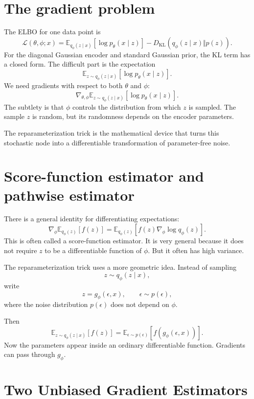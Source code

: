 
\section{The gradient problem}

The ELBO for one data point is
\[
  \mathcal L(\theta,\phi;x)
  =\mathbb E_{q_\phi(z\mid x)}[\log p_\theta(x\mid z)]
  -D_{\mathrm{KL}}(q_\phi(z\mid x)\Vert p(z)).
\]
For the diagonal Gaussian encoder and standard Gaussian prior, the KL term has a closed form.  The difficult part is the expectation
\[
  \mathbb E_{z\sim q_\phi(z\mid x)}[\log p_\theta(x\mid z)].
\]
We need gradients with respect to both \(\theta\) and \(\phi\):
\[
  \nabla_{\theta,\phi}\mathbb E_{z\sim q_\phi(z\mid x)}[\log p_\theta(x\mid z)].
\]
The subtlety is that \(\phi\) controls the distribution from which \(z\) is sampled.  The sample \(z\) is random, but its randomness depends on the encoder parameters.

The reparameterization trick is the mathematical device that turns this stochastic node into a differentiable transformation of parameter-free noise.

\section{Score-function estimator and pathwise estimator}

There is a general identity for differentiating expectations:
\[
  \nabla_\phi\mathbb E_{q_\phi(z)}[f(z)]
  =\mathbb E_{q_\phi(z)}[f(z)\nabla_\phi\log q_\phi(z)].
\]
This is often called a score-function estimator.  It is very general because it does not require \(z\) to be a differentiable function of \(\phi\).  But it often has high variance.

The reparameterization trick uses a more geometric idea.  Instead of sampling
\[
  z\sim q_\phi(z\mid x),
\]
write
\[
  z=g_\phi(\epsilon,x),
  \qquad
  \epsilon\sim p(\epsilon),
\]
where the noise distribution \(p(\epsilon)\) does not depend on \(\phi\).

Then
\[
  \mathbb E_{z\sim q_\phi(z\mid x)}[f(z)]
  =\mathbb E_{\epsilon\sim p(\epsilon)}[f(g_\phi(\epsilon,x))].
\]
Now the parameters appear inside an ordinary differentiable function.  Gradients can pass through \(g_\phi\).

\section{Two Unbiased Gradient Estimators}

